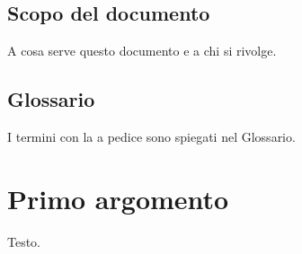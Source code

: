 \subsection{Scopo del documento}
A cosa serve questo documento e a chi si rivolge.

\subsection{Glossario}
I termini con la  a pedice sono spiegati nel Glossario.

\section{Primo argomento}
Testo.

% 


